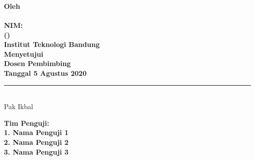 \chapter{\phantom{PENGESAHAN}}
\label{chp:pengesahan}
\begin{center}
  \bfseries\large
  \MakeUppercase{\titlename} \\
  \vspace{2\baselineskip}
  \normalfont Oleh \\
  \textbf{\authorname \\
    NIM: \authorid \\
    (\department)} \\
  \vspace{\baselineskip}
  Institut Teknologi Bandung \\
  \vspace{3\baselineskip}
  Menyetujui \\
  Dosen Pembimbing \\
  \vspace{\baselineskip}
  Tanggal 5 Agustus 2020 \\
  \vspace{5\baselineskip}
  \rule{5cm}{1pt} \\
  Pak Ikbal
\end{center}

\vspace{0.5cm} %

\begin{flushleft}
  \textbf{Tim Penguji:\\
    1. Nama Penguji 1\\ %
    2. Nama Penguji 2\\ %
    3. Nama Penguji 3}\\ %
\end{flushleft}